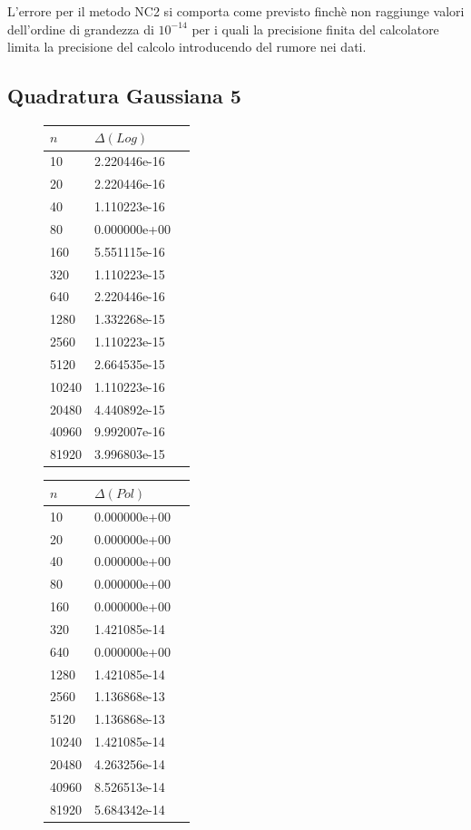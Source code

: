L'errore per il metodo NC2 si comporta come previsto finchè non raggiunge valori dell'ordine di grandezza di $10^{-14}$ per i quali la precisione finita del calcolatore limita la precisione del calcolo introducendo del rumore nei dati.

\subsection{Quadratura Gaussiana 5}

\begin{figure}[H]
 \begin{subtable}[b]{0.5\textwidth}
  \centering
\begin{tabular}{lll}
\hline
$n$ & $\Delta(Log)$\\
\hline
10 & 2.220446e-16\\
20 & 2.220446e-16\\
40 & 1.110223e-16\\
80 & 0.000000e+00\\
160 & 5.551115e-16\\
320 & 1.110223e-15\\
640 & 2.220446e-16\\
1280 & 1.332268e-15\\
2560 & 1.110223e-15\\
5120 & 2.664535e-15\\
10240 & 1.110223e-16\\
20480 & 4.440892e-15\\
40960 & 9.992007e-16\\
81920 & 3.996803e-15\\
\end{tabular}
 \end{subtable}
 \begin{subtable}[b]{0.5\textwidth}
  \centering
\begin{tabular}{lll}
\hline
$n$ & $\Delta(Pol)$\\
\hline
10 & 0.000000e+00\\
20 & 0.000000e+00\\
40 & 0.000000e+00\\
80 & 0.000000e+00\\
160 & 0.000000e+00\\
320 & 1.421085e-14\\
640 & 0.000000e+00\\
1280 & 1.421085e-14\\
2560 & 1.136868e-13\\
5120 & 1.136868e-13\\
10240 & 1.421085e-14\\
20480 & 4.263256e-14\\
40960 & 8.526513e-14\\
81920 & 5.684342e-14\\
\end{tabular}
 \end{subtable}
\end{figure}

